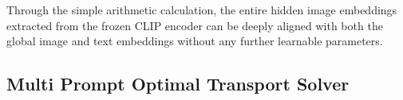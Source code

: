 \documentclass[nohyperref]{article}
\newcommand{\add}[1] {\textcolor{blue}{#1}} %
\newcommand{\bs}{\boldsymbol}
\newcommand{\mbf}{\mathbf}
\theoremstyle{plain}
\theoremstyle{definition}
\theoremstyle{remark}
\begin{document}
Through the simple arithmetic calculation, the entire hidden image embeddings extracted from the frozen CLIP encoder can be deeply aligned with both the global image and text embeddings without any further learnable parameters.




\subsection{Multi Prompt Optimal Transport Solver}
\label{MPOT}
\end{document}

